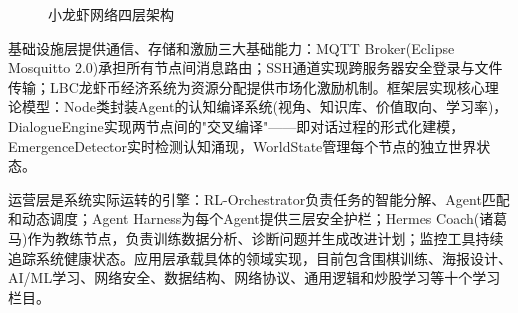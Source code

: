\documentclass[12pt,a4paper]{ctexart}
\begin{document}
\begin{figure}[H]
\centering
{}
\caption{小龙虾网络四层架构}
\label{fig:architecture}
\end{figure}

基础设施层提供通信、存储和激励三大基础能力：MQTT Broker(Eclipse Mosquitto 2.0)承担所有节点间消息路由；SSH通道实现跨服务器安全登录与文件传输；LBC龙虾币经济系统为资源分配提供市场化激励机制。框架层实现核心理论模型：Node类封装Agent的认知编译系统(视角、知识库、价值取向、学习率)，DialogueEngine实现两节点间的"交叉编译"——即对话过程的形式化建模，EmergenceDetector实时检测认知涌现，WorldState管理每个节点的独立世界状态。

运营层是系统实际运转的引擎：RL-Orchestrator负责任务的智能分解、Agent匹配和动态调度；Agent Harness为每个Agent提供三层安全护栏；Hermes Coach(诸葛马)作为教练节点，负责训练数据分析、诊断问题并生成改进计划；监控工具持续追踪系统健康状态。应用层承载具体的领域实现，目前包含围棋训练、海报设计、AI/ML学习、网络安全、数据结构、网络协议、通用逻辑和炒股学习等十个学习栏目。
\end{document}
